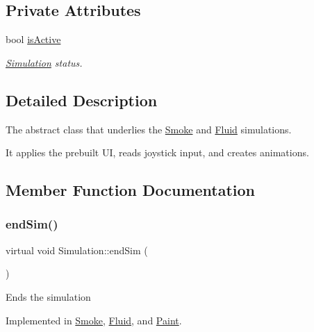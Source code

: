 \subsection*{Private Attributes}
\begin{DoxyCompactItemize}
\item 
bool \mbox{\hyperlink{classSimulation_ad76dc6e6d56b95b074f3824340f91a4c}{is\+Active}}
\begin{DoxyCompactList}\small\item\em \mbox{\hyperlink{classSimulation}{Simulation}} status. \end{DoxyCompactList}\end{DoxyCompactItemize}


\subsection{Detailed Description}
The abstract class that underlies the \mbox{\hyperlink{classSmoke}{Smoke}} and \mbox{\hyperlink{classFluid}{Fluid}} simulations. 

It applies the prebuilt UI, reads joystick input, and creates animations. 

\subsection{Member Function Documentation}
\mbox{\label{classSimulation_ab496d124202f55e741db7db9a304a7ee}} 
\subsubsection{\texorpdfstring{endSim()}{endSim()}}
{\footnotesize\ttfamily virtual void Simulation\+::end\+Sim (\begin{DoxyParamCaption}{ }\end{DoxyParamCaption})\hspace{0.3cm}{\ttfamily [pure virtual]}}

Ends the simulation 

Implemented in \mbox{\hyperlink{classSmoke_a83d3a0d8bf172fcd6bc42ebf07f0f12f}{Smoke}}, \mbox{\hyperlink{classFluid_a92695db4868e8b2ec1bf4649ce5a9d19}{Fluid}}, and \mbox{\hyperlink{classPaint_a0624eaeb1d076ab01278b27026aba249}{Paint}}.

\mbox{\label{classSimulation_a04cafb2071be521281c2584fa300b912}} 
